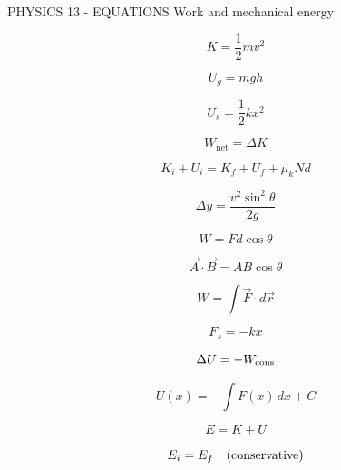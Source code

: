 PHYSICS 13 - EQUATIONS
Work and mechanical energy

$$K = \frac12 mv^2$$

$$U_g = mgh$$

$$U_s = \frac12 kx^2$$

$$W_{\text{net}} = \Delta K$$

$$K_i + U_i = K_f + U_f + \mu_k N d$$

$$\Delta y = \frac{v^2\sin^2\theta}{2g}$$


$$W=Fd\cos\theta$$

$$\vec A\cdot\vec B=AB\cos\theta$$

$$W=\int\vec F\cdot d\vec r$$

$$F_s=-kx$$

$$\Delta U=-W_{\rm cons}$$

$$U(x)=-\int F(x)\,dx+C$$

$$E=K+U$$

$$E_i=E_f\quad(\rm conservative)$$
